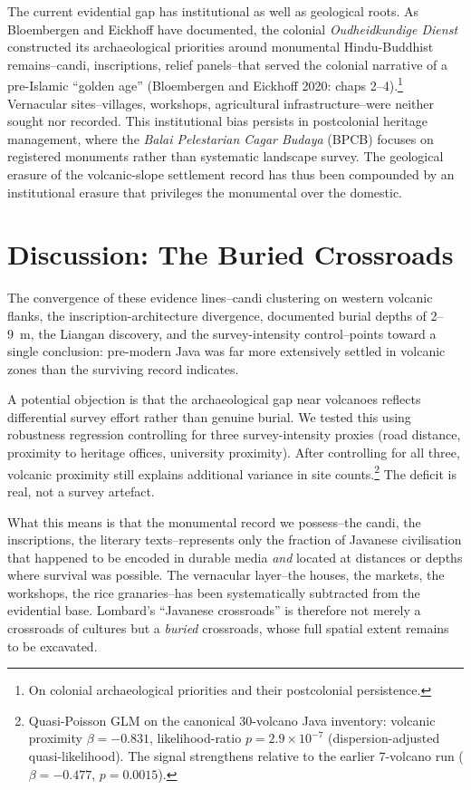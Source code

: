 \documentclass[12pt,a4paper]{article}
\begin{document}
The current evidential gap has institutional as well as geological roots.
As Bloembergen and Eickhoff have documented, the colonial \emph{Oudheidkundige Dienst} constructed its archaeological priorities around monumental Hindu-Buddhist remains--candi, inscriptions, relief panels--that served the colonial narrative of a pre-Islamic ``golden age'' (Bloembergen and Eickhoff 2020: chaps 2--4).\footnote{On colonial archaeological priorities and their postcolonial persistence.}
Vernacular sites--villages, workshops, agricultural infrastructure--were neither sought nor recorded.
This institutional bias persists in postcolonial heritage management, where the \emph{Balai Pelestarian Cagar Budaya} (BPCB) focuses on registered monuments rather than systematic landscape survey.
The geological erasure of the volcanic-slope settlement record has thus been compounded by an institutional erasure that privileges the monumental over the domestic.


\section{Discussion: The Buried Crossroads}

The convergence of these evidence lines--candi clustering on western volcanic flanks, the inscription-architecture divergence, documented burial depths of 2--9~m, the Liangan discovery, and the survey-intensity control--points toward a single conclusion: pre-modern Java was far more extensively settled in volcanic zones than the surviving record indicates.

A potential objection is that the archaeological gap near volcanoes reflects differential survey effort rather than genuine burial.
We tested this using robustness regression controlling for three survey-intensity proxies (road distance, proximity to heritage offices, university proximity).
After controlling for all three, volcanic proximity still explains additional variance in site counts.\footnote{Quasi-Poisson GLM on the canonical 30-volcano Java inventory: volcanic proximity $\beta = -0.831$, likelihood-ratio $p = 2.9 \times 10^{-7}$ (dispersion-adjusted quasi-likelihood). The signal strengthens relative to the earlier 7-volcano run ($\beta = -0.477$, $p = 0.0015$).}
The deficit is real, not a survey artefact.

What this means is that the monumental record we possess--the candi, the inscriptions, the literary texts--represents only the fraction of Javanese civilisation that happened to be encoded in durable media \emph{and} located at distances or depths where survival was possible.
The vernacular layer--the houses, the markets, the workshops, the rice granaries--has been systematically subtracted from the evidential base.
Lombard's ``Javanese crossroads'' is therefore not merely a crossroads of cultures but a \emph{buried} crossroads, whose full spatial extent remains to be excavated.
\end{document}
